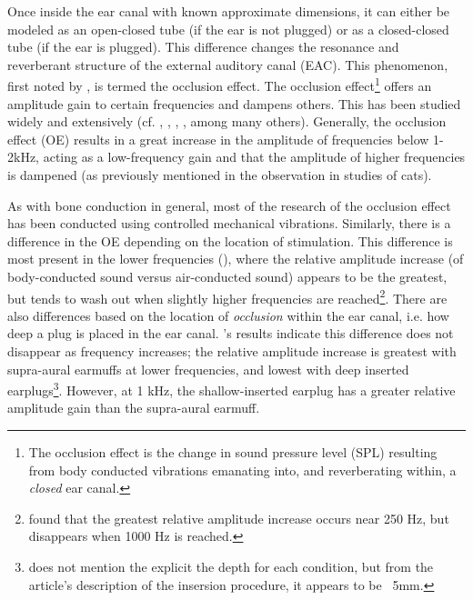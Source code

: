 \documentclass[dissertation,copyright]{uathesis}
\begin{document}

Once inside the ear canal with known approximate dimensions, it can either be modeled as an open-closed tube (if the ear is not plugged) or as a closed-closed tube (if the ear is plugged). This difference changes the resonance and reverberant structure of the external auditory canal (EAC).  This phenomenon, first noted by \cite{wheatstone:79}, is termed the occlusion effect.  The occlusion effect\footnote{The occlusion effect is the change in sound pressure level (SPL) resulting from body conducted vibrations emanating into, and reverberating within, a \textit{closed} ear canal.} offers an amplitude gain to certain frequencies and dampens others.  This has been studied widely and extensively (cf. \cite{wheatstone:79}, \cite{kelly:37}, \cite{littler:52}, \cite{goldstein:65}, among many others).  Generally, the occlusion effect (OE) results in a great increase in the amplitude of frequencies below 1-2kHz, acting as a low-frequency gain and that the amplitude of higher frequencies is dampened (as previously mentioned in the observation in studies of cats\cite{tonndorf:72}).


 
As with bone conduction in general, most of the research of the occlusion effect has been conducted using controlled mechanical vibrations.  Similarly, there is a difference in the OE depending on the location of stimulation.  This difference is most present in the lower frequencies (\cite{dean:00}), where the relative amplitude increase (of body-conducted sound versus air-conducted sound) appears to be the greatest, but tends to wash out when slightly higher frequencies are reached\footnote{\cite{dean:00} found that the greatest relative amplitude increase occurs near 250 Hz, but disappears when 1000 Hz is reached.}.  There are also differences based on the location of \textit{occlusion} within the ear canal, i.e. how deep a plug is placed in the ear canal. \cite{dean:00}'s results indicate this difference does not disappear as frequency increases; the relative amplitude increase is greatest with supra-aural earmuffs at lower frequencies, and lowest with deep inserted earplugs\footnote{\cite{dean:00} does not mention the explicit the depth for each condition, but from the article's description of the insersion procedure, it appears to be ~5mm.}. However, at 1 kHz, the shallow-inserted earplug has a greater relative amplitude gain than the supra-aural earmuff.
\end{document}
